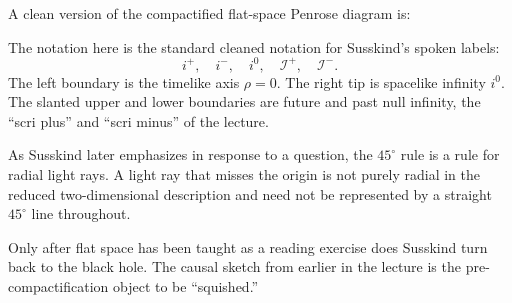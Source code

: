 A clean version of the compactified flat-space Penrose diagram is:

\begin{figure}[h]
\centering
{}
\end{figure}

The notation here is the standard cleaned notation for Susskind's spoken labels:
\begin{equation}
i^+,\quad i^-,\quad i^0,\quad \mathcal{I}^+,\quad \mathcal{I}^-.
\end{equation}
The left boundary is the timelike axis \(\rho=0\). The right tip is spacelike infinity \(i^0\). The slanted upper and lower boundaries are future and past null infinity, the ``scri plus'' and ``scri minus'' of the lecture.

\begin{remark}
As Susskind later emphasizes in response to a question, the \(45^\circ\) rule is a rule for radial light rays. A light ray that misses the origin is not purely radial in the reduced two-dimensional description and need not be represented by a straight \(45^\circ\) line throughout.
\end{remark}

Only after flat space has been taught as a reading exercise does Susskind turn back to the black hole. The causal sketch from earlier in the lecture is the pre-compactification object to be ``squished.''

